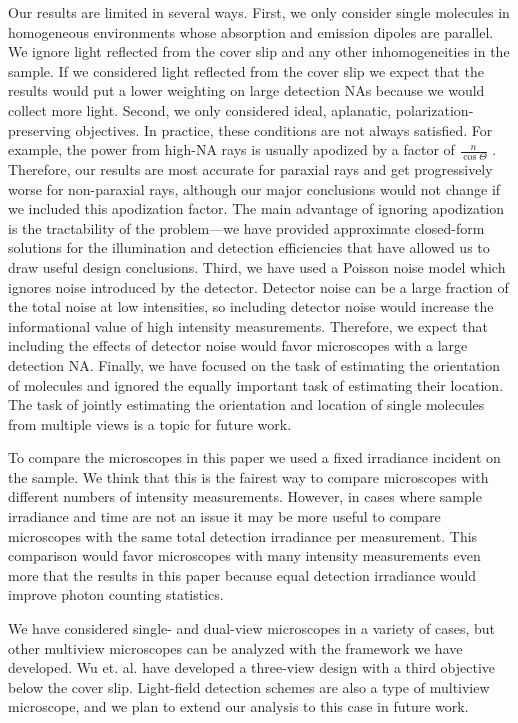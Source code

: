 \documentclass[10pt]{article}
\begin{document}
Our results are limited in several ways. First, we only consider single
molecules in homogeneous environments whose absorption and emission dipoles are
parallel. We ignore light reflected from the cover slip and any other
inhomogeneities in the sample. If we considered light reflected from the cover
slip we expect that the results would put a lower weighting on large detection
NAs because we would collect more light. Second, we only considered ideal,
aplanatic, polarization-preserving objectives. In practice, these conditions are
not always satisfied. For example, the power from high-NA rays is usually
apodized by a factor of $\frac{n}{\cos\Theta}$ \cite{nov2006}. Therefore, our
results are most accurate for paraxial rays and get progressively worse for
non-paraxial rays, although our major conclusions would not change if we
included this apodization factor. The main advantage of ignoring apodization is
the tractability of the problem---we have provided approximate closed-form
solutions for the illumination and detection efficiencies that have allowed us
to draw useful design conclusions. Third, we have used a Poisson noise model
which ignores noise introduced by the detector. Detector noise can be a large
fraction of the total noise at low intensities, so including detector noise
would increase the informational value of high intensity
measurements. Therefore, we expect that including the effects of detector noise
would favor microscopes with a large detection NA. Finally, we have focused on
the task of estimating the orientation of molecules and ignored the equally
important task of estimating their location. The task of jointly estimating the
orientation and location of single molecules from multiple views is a topic for
future work.

To compare the microscopes in this paper we used a fixed irradiance incident on
the sample. We think that this is the fairest way to compare microscopes with
different numbers of intensity measurements. However, in cases where sample
irradiance and time are not an issue it may be more useful to compare
microscopes with the same total detection irradiance per measurement. This
comparison would favor microscopes with many intensity measurements even more
that the results in this paper because equal detection irradiance would improve
photon counting statistics.

We have considered single- and dual-view microscopes in a variety of cases, but
other multiview microscopes can be analyzed with the framework we have
developed. Wu et. al. have developed a three-view design with a third objective
below the cover slip\cite{wu2016}. Light-field detection schemes are also a type
of multiview microscope\cite{levoy2006}, and we plan to extend our analysis to
this case in future work.
\end{document}
